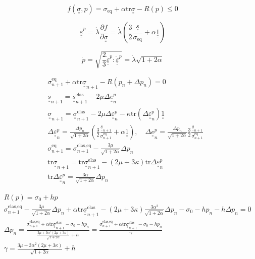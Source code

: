 \documentclass[12pt]{article}
\newcommand\ul[1]{\underline{#1}}
\newcommand\uusigma{\ul{\ul{\sigma}}}
\newcommand\uus{\ul{\ul{s}}}
\newcommand\uue{\ul{\ul{e}}}
\newcommand\uuUnit{\ul{\ul{1}}}
\newcommand\uueps{\ul{\ul{\varepsilon}}}
\newcommand\Deltaepsp{\Delta \uueps_{n}^p}
\newcommand\Deltaep{\Delta \uue_{n}^p}
\newcommand\sigmaeqn{\sigma_{n+1}^\text{eq}}
\newcommand\sigmaeqnelas{\sigma_{n+1}^\text{elas,eq}}
\newcommand\uusn{\uus_{n+1}}
\newcommand\uusigman{\ul{\ul{\sigma}}_{n+1}}
\newcommand\uusigmanelas{\uusigman^{\text{elas}}}
\newcommand\mtr{\mathrm{tr}}
\begin{document}
\begin{equation}
    f(\uusigma, p) = \sigma_{\text{eq}} + \alpha \mtr \uusigma - R(p) \leq 0
\end{equation}

\begin{equation}
    \dot{\uueps}^p = \dot{\lambda} \frac{\partial f}{\partial \uusigma} = \dot{\lambda} \left(\frac{3}{2} \frac{\uus}{\sigma_\text{eq}} + \alpha \uuUnit \right)
\end{equation}

\begin{equation}
    \dot{p} = \sqrt{\frac{2}{3} \dot{\uueps}^p : \dot{\uueps}^p} = \dot{\lambda}\sqrt{1 + 2\alpha}
\end{equation}

\begin{align}
    & \sigmaeqn + \alpha \mtr \uusigman - R(p_n + \Delta p_n) = 0 \\
    & \uus_{n+1} = \uus_{n+1}^\text{elas} - 2\mu\Delta\uue_n^p \\
    & \uusigma_{n+1} = \uusigma_{n+1}^\text{elas} - 2\mu \Deltaepsp - \kappa \mtr (\Deltaepsp) \uuUnit \\
    & \Deltaepsp = \frac{\Delta p_n}{\sqrt{1 + 2\alpha}} \left( \frac{3}{2} \frac{\uusn}{\sigmaeqn} + \alpha \uuUnit \right), \quad \Deltaep = \frac{\Delta p_n}{\sqrt{1 + 2\alpha}} \frac{3}{2} \frac{\uusn}{\sigmaeqn} \\
    & \sigmaeqn = \sigmaeqnelas - \frac{3\mu}{\sqrt{1 + 2\alpha}}\Delta p_n \\
    & \mtr \uusigman = \mtr \uusigmanelas - (2 \mu + 3\kappa) \mtr \Deltaepsp \\
    & \mtr \Deltaepsp = \frac{3\alpha}{\sqrt{1 + 2\alpha}} \Delta p_n
\end{align}

\begin{align}
    & R(p) = \sigma_0 + h p \\
    & \sigmaeqnelas - \frac{3\mu}{\sqrt{1 + 2\alpha}}\Delta p_n + \alpha \mtr \uusigmanelas - (2 \mu + 3\kappa) \frac{3\alpha^2}{\sqrt{1 + 2\alpha}} \Delta p_n - \sigma_0 - h p_n - h \Delta p_n = 0 \\
    & \Delta p_n = \frac{ \sigmaeqnelas + \alpha \mtr \uusigmanelas - \sigma_0 - h p_n}{ \frac{3\mu + 3\alpha^2(2 \mu + 3\kappa)}{\sqrt{1 + 2\alpha}} + h} = \frac{ \sigmaeqnelas + \alpha \mtr \uusigmanelas - \sigma_0 - h p_n}{ \gamma } \\
    & \gamma = \frac{3\mu + 3\alpha^2(2 \mu + 3\kappa)}{\sqrt{1 + 2\alpha}} + h
\end{align}
\end{document}
